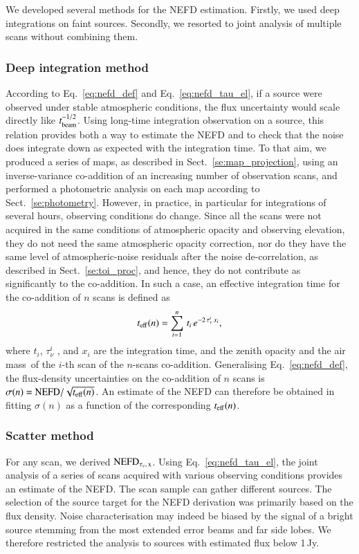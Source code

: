 \documentclass[traditionalabstract]{aa}
\newcommand{\taunu}{\tau_{\nu}}
\newcommand{\airmass}{air mass}
\newcommand{\lp}[1]{#1}
\newcommand{\rev}[1]{#1}
\begin{document}
{We developed several methods for the NEFD estimation. Firstly,
we used deep integrations on faint sources. Secondly, we resorted to joint
analysis of multiple scans without combining them.

\subsubsection{Deep integration method}
According to Eq.~\ref{eq:nefd_def} and Eq.~\ref{eq:nefd_tau_el}, if a
source were observed under stable atmospheric conditions, the flux
uncertainty would scale directly like
$t_{\rm{beam}}^{-1/2}$. Using long-time integration observation on a
source, this relation provides both a way to estimate the NEFD and to
check that the noise does integrate down as expected with the integration
time. To that aim, we produced a series of maps, as described in Sect.~\ref{se:map_projection},
using an inverse-variance co-addition of an increasing number of observation
scans, and performed a photometric analysis on each map according to
Sect.~\ref{se:photometry}. However, in practice, in particular for
integrations of several hours, observing conditions do change.
Since all the scans were not acquired in the same conditions of
atmospheric opacity and observing elevation, {\rev they do not need
the same atmospheric opacity correction, nor do they have
the same level of atmospheric-noise residuals after the noise
de-correlation, as described in Sect.~\ref{se:toi_proc}}, and hence,
they do not contribute as significantly to
the co-addition. In such a case, an effective integration time for the
co-addition of $n$ scans is defined as
%
\begin{equation}
t_{\rm{eff}}(n) = \sum_{i=1}^{n}\, t_i\,  e^{-2\,\taunu^i\, x_i},
\label{eq:sigma_tau_w8}
\end{equation}
%
where $t_i$, $\taunu^i$ , and $x_i$ are the integration time, and the zenith
opacity and the \airmass\ of the $i$-th scan of the $n$-scans
co-addition.
Generalising Eq.~\ref{eq:nefd_def}, the flux-density uncertainties on
the co-addition of $n$ scans is $\sigma(n) = \rm{NEFD}/\sqrt{t_{\rm{eff}}(n)}$.
An estimate of the
NEFD can therefore be obtained in fitting
$\sigma(n)$ as a function of the corresponding $t_{\rm{eff}}(n)$.

\subsubsection{Scatter method}
For any scan, we derived $\rm{NEFD}_{\taunu,\, x}$.
Using Eq.~\ref{eq:nefd_tau_el}, the joint analysis of a series of
scans acquired with various observing conditions provides an estimate
of the NEFD. The scan sample can gather different sources. 
The selection of the source target for the NEFD derivation was
primarily based on the flux density. Noise
characterisation may indeed be biased {\lp by the signal of a bright source
stemming from the most extended error beams and far side lobes.}
We therefore restricted the analysis to sources with estimated flux below 1\,Jy.

}
\end{document}
